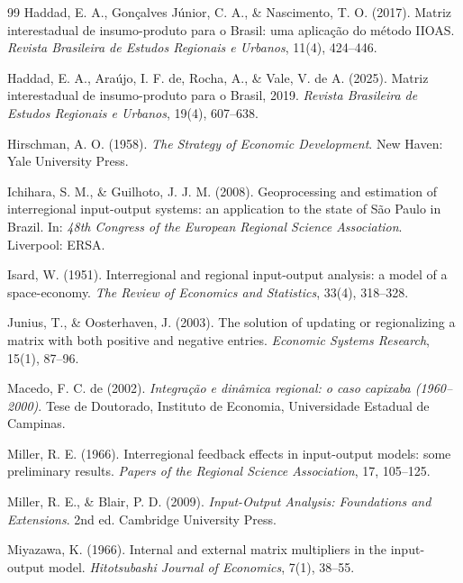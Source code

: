 \documentclass[11pt,a4paper]{article}
\begin{document}
\begin{thebibliography}{99}
Haddad, E. A., Gonçalves Júnior, C. A., \& Nascimento, T. O. (2017).
Matriz interestadual de insumo-produto para o Brasil: uma aplicação do método
IIOAS. \textit{Revista Brasileira de Estudos Regionais e Urbanos}, 11(4), 424--446.

Haddad, E. A., Araújo, I. F. de, Rocha, A., \& Vale, V. de A. (2025). Matriz interestadual de
insumo-produto para o Brasil, 2019. \textit{Revista Brasileira de Estudos Regionais e Urbanos},
19(4), 607--638.

Hirschman, A. O. (1958). \textit{The Strategy of Economic Development}. New Haven:
Yale University Press.

Ichihara, S. M., \& Guilhoto, J. J. M. (2008). Geoprocessing and estimation of
interregional input-output systems: an application to the state of São Paulo in Brazil.
In: \textit{48th Congress of the European Regional Science Association}. Liverpool: ERSA.

Isard, W. (1951). Interregional and regional input-output analysis: a model of a
space-economy. \textit{The Review of Economics and Statistics}, 33(4), 318--328.

Junius, T., \& Oosterhaven, J. (2003). The solution of updating or regionalizing a matrix with
both positive and negative entries. \textit{Economic Systems Research}, 15(1), 87--96.

Macedo, F. C. de (2002). \textit{Integração e dinâmica regional: o caso capixaba
(1960--2000)}. Tese de Doutorado, Instituto de Economia, Universidade Estadual de
Campinas.

Miller, R. E. (1966). Interregional feedback effects in input-output models: some
preliminary results. \textit{Papers of the Regional Science Association}, 17, 105--125.

Miller, R. E., \& Blair, P. D. (2009). \textit{Input-Output Analysis: Foundations and
Extensions}. 2nd ed. Cambridge University Press.

Miyazawa, K. (1966). Internal and external matrix multipliers in the input-output model.
\textit{Hitotsubashi Journal of Economics}, 7(1), 38--55.


\end{thebibliography}
\end{document}
